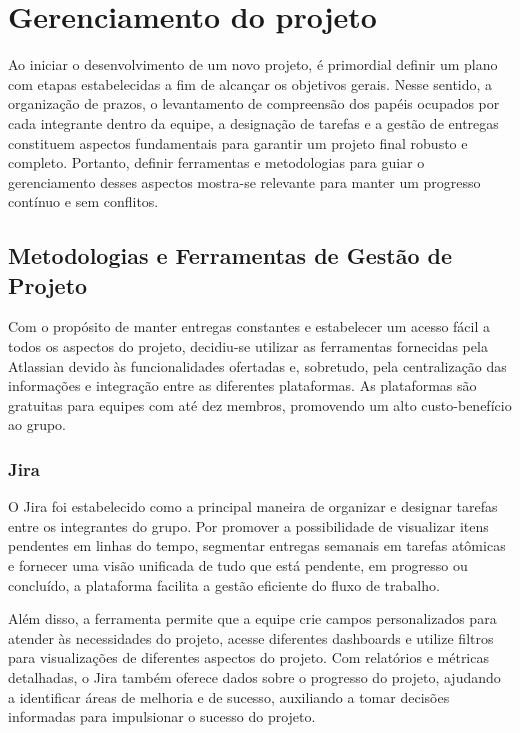 \chapter{Gerenciamento do projeto}
\label{chap:metodologia}

    Ao iniciar o desenvolvimento de um novo projeto, é primordial definir um plano com etapas estabelecidas a fim de alcançar os objetivos gerais. Nesse sentido, a organização de prazos, o levantamento de compreensão dos papéis ocupados por cada integrante dentro da equipe, a designação de tarefas e a gestão de entregas constituem aspectos fundamentais para garantir um projeto final robusto e completo. Portanto, definir ferramentas e metodologias para guiar o gerenciamento desses aspectos mostra-se relevante para manter um progresso contínuo e sem conflitos.


\section{Metodologias e Ferramentas de Gestão de Projeto}\label{sec:exemplo-de-algoritmos-e-figuras}

    Com o propósito de manter entregas constantes e estabelecer um acesso fácil a todos os aspectos do projeto, decidiu-se utilizar as ferramentas fornecidas pela Atlassian devido às funcionalidades ofertadas e, sobretudo, pela centralização das informações e integração entre as diferentes plataformas. As plataformas são gratuitas para equipes com até dez membros, promovendo um alto custo-benefício ao grupo. 

    \subsection{Jira}
    
    O Jira foi estabelecido como a principal maneira de organizar e designar tarefas entre os integrantes do grupo. Por promover a possibilidade de visualizar itens pendentes em linhas do tempo, segmentar entregas semanais em tarefas atômicas e fornecer uma visão unificada de tudo que está pendente, em progresso ou concluído, a plataforma facilita a gestão eficiente do fluxo de trabalho.
    
    Além disso, a ferramenta permite que a equipe crie campos personalizados para atender às necessidades do projeto, acesse diferentes dashboards e utilize filtros para visualizações de diferentes aspectos do projeto. Com relatórios e métricas detalhadas, o Jira também oferece dados sobre o progresso do projeto, ajudando a identificar áreas de melhoria e de sucesso, auxiliando a tomar decisões informadas para impulsionar o sucesso do projeto.

